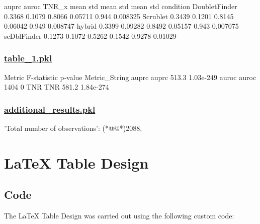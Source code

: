 \documentclass[11pt]{article}
\begin{document}
\begin{codeoutput}
               auprc          auroc          TNR\_x         
                mean     std   mean     std   mean      std
condition                                                  
DoubletFinder 0.3368  0.1079 0.8066 0.05711  0.944 0.008325
Scrublet      0.3439  0.1201 0.8145 0.06042  0.949 0.008747
hybrid        0.3399 0.09282 0.8492 0.05157  0.943 0.007075
scDblFinder   0.1273  0.1072 0.5262  0.1542 0.9278  0.01029
\end{codeoutput}\hypertarget{file-table-1-pkl}{}

\subsubsection*{\hyperlink{code-Data Analysis-table-1-pkl}{table\_1.pkl}}

\begin{codeoutput}
              Metric  F-statistic    p-value
Metric\_String                               
auprc          auprc        513.3  1.03e-249
auroc          auroc         1404          0
TNR              TNR        581.2  1.84e-274
\end{codeoutput}\hypertarget{file-additional-results-pkl}{}

\subsubsection*{\hyperlink{code-Data Analysis-additional-results-pkl}{additional\_results.pkl}}

\begin{codeoutput}
{
    'Total number of observations': (*@@*)2088,
}
\end{codeoutput}

\section{LaTeX Table Design}
\subsection{{Code}}
The LaTeX Table Design was carried out using the following custom code:
\end{document}
